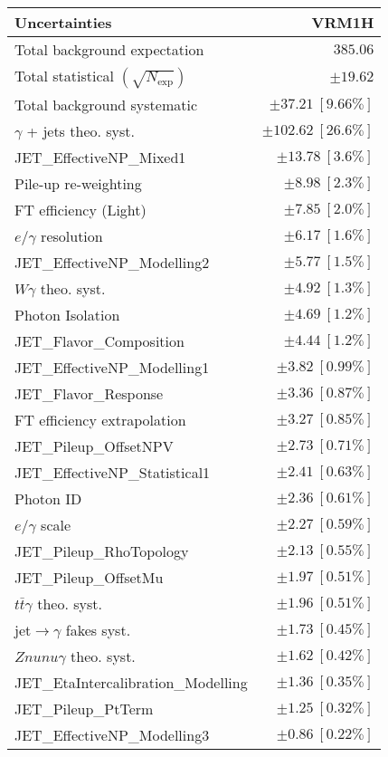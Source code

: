 \begin{tabular}{lr}
\hline
\textbf{Uncertainties} & \textbf{VRM1H} \\
\hline
Total background expectation & $385.06$ \\
\hline
Total statistical $(\sqrt{N_\mathrm{exp}})$ & $\pm 19.62$ \\
Total background systematic & $\pm 37.21\ [9.66\%]$ \\
\hline
\hline
$\gamma$ + jets theo. syst. & $\pm 102.62\ [26.6\%]$ \\
JET\_EffectiveNP\_Mixed1 & $\pm 13.78\ [3.6\%]$ \\
Pile-up re-weighting & $\pm 8.98\ [2.3\%]$ \\
FT efficiency (Light) & $\pm 7.85\ [2.0\%]$ \\
$e/\gamma$ resolution & $\pm 6.17\ [1.6\%]$ \\
JET\_EffectiveNP\_Modelling2 & $\pm 5.77\ [1.5\%]$ \\
$W\gamma$ theo. syst. & $\pm 4.92\ [1.3\%]$ \\
Photon Isolation & $\pm 4.69\ [1.2\%]$ \\
JET\_Flavor\_Composition & $\pm 4.44\ [1.2\%]$ \\
JET\_EffectiveNP\_Modelling1 & $\pm 3.82\ [0.99\%]$ \\
JET\_Flavor\_Response & $\pm 3.36\ [0.87\%]$ \\
FT efficiency extrapolation & $\pm 3.27\ [0.85\%]$ \\
JET\_Pileup\_OffsetNPV & $\pm 2.73\ [0.71\%]$ \\
JET\_EffectiveNP\_Statistical1 & $\pm 2.41\ [0.63\%]$ \\
Photon ID & $\pm 2.36\ [0.61\%]$ \\
$e/\gamma$ scale & $\pm 2.27\ [0.59\%]$ \\
JET\_Pileup\_RhoTopology & $\pm 2.13\ [0.55\%]$ \\
JET\_Pileup\_OffsetMu & $\pm 1.97\ [0.51\%]$ \\
$t\bar{t}\gamma$ theo. syst. & $\pm 1.96\ [0.51\%]$ \\
jet$\to\gamma$ fakes syst. & $\pm 1.73\ [0.45\%]$ \\
$Znunu\gamma$ theo. syst. & $\pm 1.62\ [0.42\%]$ \\
JET\_EtaIntercalibration\_Modelling & $\pm 1.36\ [0.35\%]$ \\
JET\_Pileup\_PtTerm & $\pm 1.25\ [0.32\%]$ \\
JET\_EffectiveNP\_Modelling3 & $\pm 0.86\ [0.22\%]$ \\

\end{tabular}
